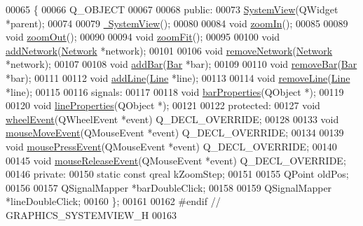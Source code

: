 \begin{DoxyCode}
00065 \{
00066   Q\_OBJECT
00067 
00068 \textcolor{keyword}{public}:
00073   \hyperlink{group___graphics_ga660a455ff7b98cb92410b0bf1cbb2eeb}{SystemView}(QWidget *parent);
00074 
00079   \hyperlink{group___graphics_ga0091352981c1efa5498819b69698db44}{~SystemView}();
00080 
00084   \textcolor{keywordtype}{void} \hyperlink{group___graphics_ga93170319ee5fbf9098353b383fc8a368}{zoomIn}();
00085 
00089   \textcolor{keywordtype}{void} \hyperlink{group___graphics_gaf971471c76265ec21cdde2aafe9b609f}{zoomOut}();
00090 
00094   \textcolor{keywordtype}{void} \hyperlink{group___graphics_gac1bf0b6a80216df74a8da1cb8ac5f0e8}{zoomFit}();
00095 
00100   \textcolor{keywordtype}{void} \hyperlink{group___graphics_gae183447d0777c7b2b940a977f9b64c3f}{addNetwork}(\hyperlink{class_network}{Network} *network);
00101 
00106   \textcolor{keywordtype}{void} \hyperlink{group___graphics_ga2078ad08ff93b9a8683d567e3f9f714e}{removeNetwork}(\hyperlink{class_network}{Network} *network);
00107 
00108   \textcolor{keywordtype}{void} \hyperlink{group___graphics_gac4e02019d41c203c788ff1e6f3ee460e}{addBar}(\hyperlink{class_bar}{Bar} *bar);
00109 
00110   \textcolor{keywordtype}{void} \hyperlink{group___graphics_ga1e96b08395a2f1b961dedbb3e8c99a50}{removeBar}(\hyperlink{class_bar}{Bar} *bar);
00111 
00112   \textcolor{keywordtype}{void} \hyperlink{group___graphics_gaed2fb15d518cab9a52ea1ee258846bfc}{addLine}(\hyperlink{class_line}{Line} *line);
00113   
00114   \textcolor{keywordtype}{void} \hyperlink{group___graphics_ga4af1d763d9b9c02933e62d1f6231ad18}{removeLine}(\hyperlink{class_line}{Line} *line);
00115   
00116 signals:
00117 
00118   \textcolor{keywordtype}{void} \hyperlink{class_system_view_a90bd4b070c8abaa5995899154421eb44}{barProperties}(QObject *);
00119 
00120   \textcolor{keywordtype}{void} \hyperlink{class_system_view_a58c4a0bf68178ab59066819118214360}{lineProperties}(QObject *);
00121 
00122 \textcolor{keyword}{protected}:
00127   \textcolor{keywordtype}{void} \hyperlink{group___graphics_gaab2fa6cebf9022eb6bf31497c0789675}{wheelEvent}(QWheelEvent *event) Q\_DECL\_OVERRIDE;
00128 
00133   \textcolor{keywordtype}{void} \hyperlink{group___graphics_gab19e233cd697852dd71140971cb6e122}{mouseMoveEvent}(QMouseEvent *event) Q\_DECL\_OVERRIDE;
00134 
00139   \textcolor{keywordtype}{void} \hyperlink{group___graphics_ga42d4a485d6d9bd891d9505a5213cf783}{mousePressEvent}(QMouseEvent *event) Q\_DECL\_OVERRIDE;
00140 
00145   \textcolor{keywordtype}{void} \hyperlink{group___graphics_gaa8a2664405194bbe29daa454aead7416}{mouseReleaseEvent}(QMouseEvent *event) Q\_DECL\_OVERRIDE;
00146 \textcolor{keyword}{private}:
00150   \textcolor{keyword}{static} \textcolor{keyword}{const} qreal kZoomStep;
00151 
00155   QPoint oldPos;
00156 
00157   QSignalMapper *barDoubleClick;
00158 
00159   QSignalMapper *lineDoubleClick;
00160 \};
00161 
00162 \textcolor{preprocessor}{#endif  // GRAPHICS\_SYSTEMVIEW\_H}
00163 
\end{DoxyCode}
